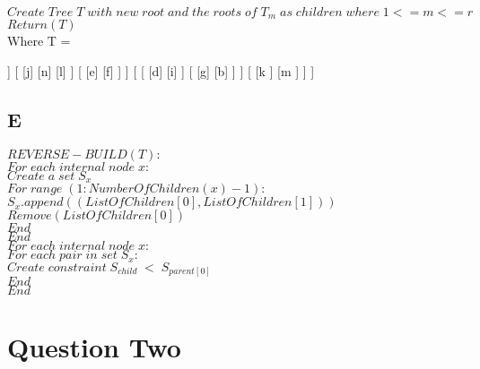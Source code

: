 \documentclass[paper=a4, fontsize=11pt]{scrartcl}
\newcommand\tab[1][1cm]{\hspace*{#1}}
\numberwithin{equation}{section}		%
\numberwithin{figure}{section}			%
\numberwithin{table}{section}				%
\begin{document}
\noindent
\tab$Create\;Tree\;T\;with\;new\;root\;and\;the\;roots\;of\;T_m\;as\;children\;where\;1<=m<=r$\\


\noindent
\tab$Return(T)$\\


\noindent
Where T =
\begin{center}
\begin{forest}
[
	[
		[
			[c]
			[h]
			[a]
		]
		[
			[j]
			[n]
			[l]
		]
		[
			[e]
			[f]
		]
	]
	[
		[
			[d]
			[i]
		]
		[
			[g]
			[b]
		]
	]
	[
		[k
		]
		[m
		]
	]
]
\end{forest}
\end{center}

\subsection*{E}

\iffalse
Reverse the Build algorithm, i,e. design an algorithm that takes a tree with labelled leaves
as an input, and produces a set of constraints of the form (i, j) < (k, l), such that when
Build runs on that set, the result is (an isomorphic copy of) the input tree. Prove the
correctness of your algorithm. Also, a smaller output (number of constraints) would give
you a better mark. 
\fi

$REVERSE-BUILD(T):$\\
\tab$For\;each\;internal\;node\;x:$\\
\tab\tab$Create\;a\;set\;S_x$\\
\tab\tab$For\;range\;(1:NumberOfChildren(x)-1):$\\
\tab\tab\tab$S_x.append((ListOfChildren[0],ListOfChildren[1]))$\\
\tab\tab\tab$Remove(ListOfChildren[0])$\\
\tab\tab$End$\\
\tab$End$\\
\tab$For\;each\;internal\;node\;x:$\\
\tab\tab$For\;each\;pair\;in\;set\;S_x:$\\
\tab\tab\tab$Create\;constraint\;S_{child}\;<\;S_{parent[0]}$\\
\tab\tab$End$\\
\tab$End$\\


\section*{Question Two}
\end{document}
